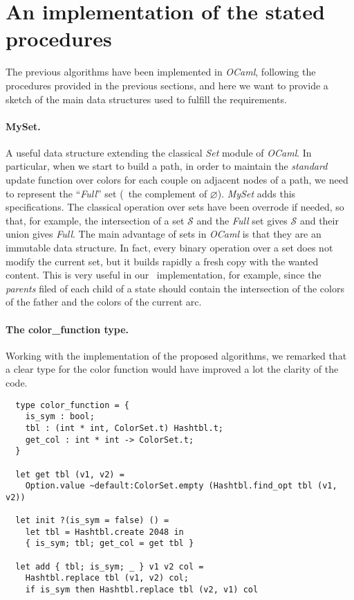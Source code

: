 \section{An implementation of the stated procedures}

The previous algorithms have been implemented in \textit{OCaml}, following the procedures provided in the previous sections, and here we want to provide a sketch of the main data structures used to fulfill the requirements.

\paragraph{MySet.} A useful data structure extending the classical \textit{Set} module of \textit{OCaml}. In particular, when we start to build a path, in order to maintain the \textit{standard} update function over colors for each couple on adjacent nodes of a path, we need to represent the ``\textit{Full}'' set (\ie\ the complement of $\varnothing$). \textit{MySet} adds this specifications. The classical operation over sets have been overrode if needed, so that, for example, the intersection of a set $\mathcal{S}$ and the \textit{Full} set gives $\mathcal{S}$ and their union gives \textit{Full}. The main advantage of sets in \textit{OCaml} is that they are an immutable data structure. In fact, every binary operation over a set does not modify the current set, but it builds rapidly a fresh copy with the wanted content. This is very useful in our \mdd\ implementation, for example, since the \textit{parents} filed of each child of a state should contain the intersection of the colors of the father and the colors of the current arc.

\paragraph{The color\_function type.} Working with the implementation of the proposed algorithms, we remarked that a clear type for the color function would have improved a lot the clarity of the code.

\begin{verbatim}
  type color_function = {
    is_sym : bool;
    tbl : (int * int, ColorSet.t) Hashtbl.t;
    get_col : int * int -> ColorSet.t;
  }

  let get tbl (v1, v2) =
    Option.value ~default:ColorSet.empty (Hashtbl.find_opt tbl (v1, v2))

  let init ?(is_sym = false) () =
    let tbl = Hashtbl.create 2048 in
    { is_sym; tbl; get_col = get tbl }

  let add { tbl; is_sym; _ } v1 v2 col =
    Hashtbl.replace tbl (v1, v2) col;
    if is_sym then Hashtbl.replace tbl (v2, v1) col
\end{verbatim}

